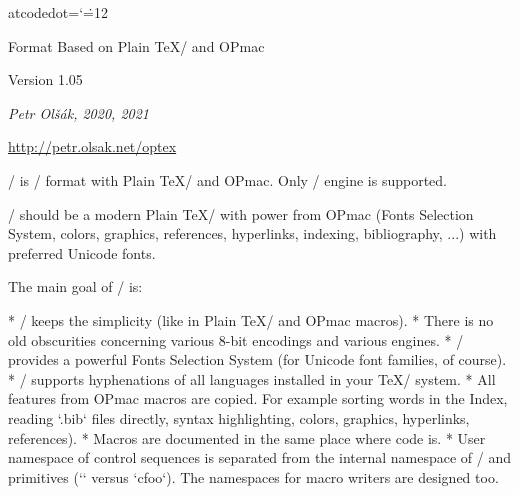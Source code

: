 

  \let\enddocument=\endinput
\let\_catcodedot=\relax \catcode`\.=12 %

\typosize[10/12]  %

\begingroup \typosize [11/13.5] %



\centerline{\rm\OpTeX}
\vskip-8mm

\tit Format Based on Plain \TeX/ and OPmac

\hfill Version 1.05

\centerline{\it Petr Olšák, 2020, 2021}

\bigskip
\centerline{\url{http://petr.olsak.net/optex}}


\bigskip
\noindent
\OpTeX/ is \LuaTeX/ format with Plain \TeX/ and OPmac. Only \LuaTeX/ engine
is supported. 

\OpTeX/ should be a modern Plain \TeX/ with power from OPmac (Fonts
Selection System, colors, graphics, references, hyperlinks,
indexing, bibliography, ...) with preferred Unicode fonts.

The main goal of \OpTeX/ is:

\begitems
* \OpTeX/ keeps the simplicity (like in Plain \TeX/ and OPmac macros).
* There is no old obscurities concerning various 8-bit encodings and
  various engines.
* \OpTeX/ provides a powerful Fonts Selection System (for Unicode font
  families, of course).
* \OpTeX/ supports hyphenations of all languages installed in your \TeX/ system.
* All features from OPmac macros are copied. For example sorting words in
  the Index, reading `.bib` files directly, syntax 
  highlighting, colors, graphics, hyperlinks, references).
* Macros are documented in the same place where code is.
* User namespace of control sequences is separated from the internal namespace
  of \OpTeX/ and primitives (`\foo` versus `\_foo`).
  The namespaces for macro writers are designed too.
\enditems

